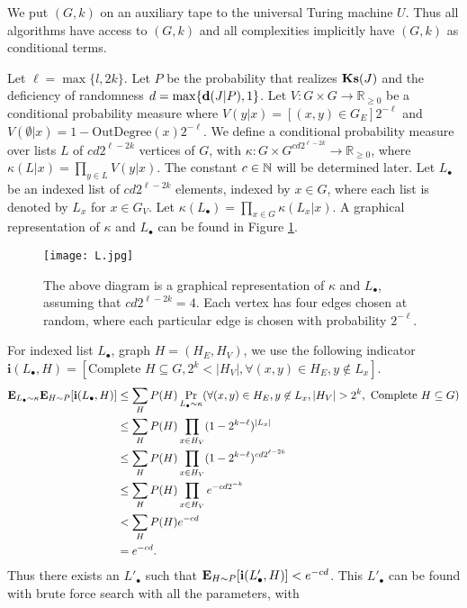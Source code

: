 \documentclass[11pt]{article}\textwidth 6.5in\textheight 9in
\begin{document}
\begin{prf}
We put $( G,k)$ on an auxiliary tape to the universal Turing machine $U$. Thus all algorithms have access to $(G,k)$ and all complexities implicitly have $(G,k)$ as conditional terms.

Let $\ell=\max\{l,2k\}$. Let $P$ be the probability that realizes $\mathbf{Ks}(J)$ and the deficiency of randomness $d=\max\{{\mathbf d}(J|P),1\}$. Let $V:G\times G\rightarrow\mathbb{R}_{\geq 0}$ be a conditional probability measure where $V(y|x)=[(x,y)\in G_E]2^{-\ell}$ and $V(\emptyset|x)=1-\mathrm{OutDegree}(x)2^{-\ell}$. We define a conditional probability measure over lists $L$ of $cd2^{\ell-2k}$ vertices of $G$, with $\kappa : G\times G^{cd2^{\ell-2k}}\rightarrow\mathbb{R}_{\geq 0}$, where $\kappa(L|x)=\prod_{y\in L}V(y|x)$. The constant $c\in\mathbb{N}$ will be determined later. Let $L_{\bullet}$ be an indexed list of $cd2^{\ell-2k}$ elements, indexed by $x\in G$, where each list is denoted by $L_x$ for $x\in G_V$. Let $\kappa(L_\bullet)=\prod_{x\in G}\kappa(L_x|x)$. A graphical representation of $\kappa$ and $L_\bullet$ can be found in Figure \ref{fig:L}.\begin{figure}     
  \centering
  \texttt{[image: L.jpg]}
  \caption{The above diagram is a graphical representation of $\kappa$ and $L_\bullet$, assuming that $cd2^{\ell-2k}=4$. Each vertex has four edges chosen at random, where each particular edge is chosen with probability $2^{-\ell}$.}
  \label{fig:L}
\end{figure} For indexed list $L_\bullet$, graph $H=(H_E,H_V)$, we use the following indicator $\mathbf{i}(L_\bullet,H)=[\textrm{Complete }H\subseteq G, 2^k< |H_V|, \forall (x,y)\in H_E, y\not\in L_x]$.
	\begin{align*}
	\E_{L_\bullet\sim \kappa}\E_{H\sim P}[\i(L_\bullet,H)]&\leq \sum_HP(H)\Pr_{L_\bullet\sim \kappa}(\forall (x,y)\in H_E, y\not\in L_x, |H_V|>2^k,\textrm{ Complete }H\subseteq G)\\
	&\leq \sum_HP(H)\prod_{x\in H_V}(1-2^{k-\ell})^{|L_x|}\\
	&\leq \sum_HP(H)\prod_{x\in H_V}(1-2^{k-\ell})^{cd2^{\ell-2k}}\\
	&\leq \sum_HP(H)\prod_{x\in H_V}e^{-cd2^{-k}}\\
	&< \sum_HP(H)e^{-cd}\\
	&= e^{-cd}. 
	\end{align*}
	Thus there exists an $L'_\bullet$ such that ${\mathbf E}_{H\sim P}[\mathbf{i}(L'_\bullet,H)]< e^{-cd}$. This $L'_\bullet$ can be found with brute force search with all the parameters, with 

\end{prf}
\end{document}
